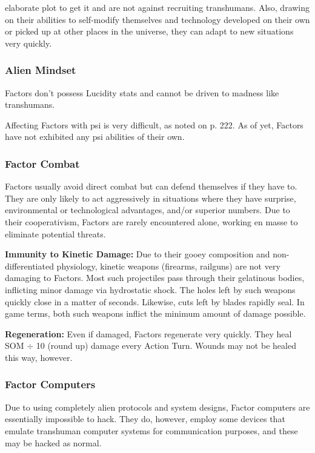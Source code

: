 elaborate plot to get it and are not against recruiting transhumans. Also, drawing on their abilities to self-modify themselves and technology developed on their own or picked up at other places in the universe, they can adapt to new situations very quickly. 

\subsubsection{Alien Mindset} 

Factors don't possess Lucidity stats and cannot be driven to madness like transhumans. 

Affecting Factors with psi is very difficult, as noted on p. 222. As of yet, Factors have not exhibited any psi abilities of their own. 

\subsubsection{Factor Combat } 

Factors usually avoid direct combat but can defend themselves if they have to. They are only likely to act aggressively in situations where they have surprise, environmental or technological advantages, and/or superior numbers. Due to their cooperativism, Factors are rarely encountered alone, working en masse to eliminate potential threats. 

\textbf{Immunity to Kinetic Damage: }Due to their gooey composition and non-differentiated physiology, kinetic weapons (firearms, railguns) are not very damaging to Factors. Most such projectiles pass through their gelatinous bodies, inflicting minor damage via hydrostatic shock. The holes left by such weapons quickly close in a matter of seconds. Likewise, cuts left by blades rapidly seal. In game terms, both such weapons inflict the minimum amount of damage possible. 

\textbf{Regeneration: }Even if damaged, Factors regenerate very quickly. They heal SOM $\div$ 10 (round up) damage every Action Turn. Wounds may not be healed this way, however. 

\subsubsection{Factor Computers} 

Due to using completely alien protocols and system designs, Factor computers are essentially impossible to hack. They do, however, employ some devices that emulate transhuman computer systems for communication purposes, and these may be hacked as normal. 

